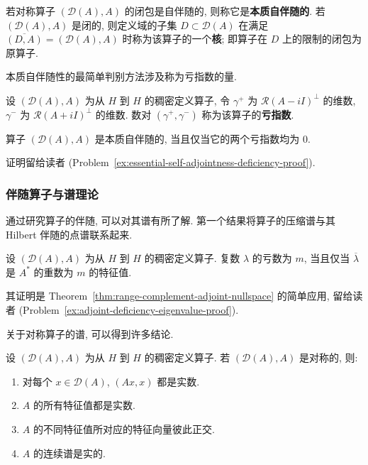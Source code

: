 \begin{Definition}
\label{def:essential-self-adjointness-and-core}
若对称算子 $(\mathcal{D}(A),A)$ 的闭包是自伴随的, 则称它是\textbf{本质自伴随的}. 若 $(\mathcal{D}(A),A)$ 是闭的, 则定义域的子集 $D\subset\mathcal{D}(A)$ 在满足 $\overline{(D,A)}=(\mathcal{D}(A),A)$ 时称为该算子的一个\textbf{核}; 即算子在 $D$ 上的限制的闭包为原算子.
\end{Definition}

本质自伴随性的最简单判别方法涉及称为亏指数的量.

\begin{Definition}
\label{def:operator-deficiency-indices}
设 $(\mathcal{D}(A),A)$ 为从 $H$ 到 $H$ 的稠密定义算子, 令 $\gamma^+$ 为 $\mathcal{R}(A-iI)^\perp$ 的维数, $\gamma^-$ 为 $\mathcal{R}(A+iI)^\perp$ 的维数. 数对 $(\gamma^+,\gamma^-)$ 称为该算子的\textbf{亏指数}.
\end{Definition}

\begin{Theorem}
\label{thm:essential-self-adjointness-zero-deficiency}
算子 $(\mathcal{D}(A),A)$ 是本质自伴随的, 当且仅当它的两个亏指数均为 $0$.
\end{Theorem}

证明留给读者 (Problem~\ref{ex:essential-self-adjointness-deficiency-proof}).

\subsubsection{伴随算子与谱理论}\label{subsec:adjoint-operators-spectral-theory}

通过研究算子的伴随, 可以对其谱有所了解. 第一个结果将算子的压缩谱与其 Hilbert 伴随的点谱联系起来.

\begin{Theorem}
\label{thm:adjoint-deficiency-conjugate-eigenvalue}
设 $(\mathcal{D}(A),A)$ 为从 $H$ 到 $H$ 的稠密定义算子. 复数 $\lambda$ 的亏数为 $m$, 当且仅当 $\overline\lambda$ 是 $A^*$ 的重数为 $m$ 的特征值.
\end{Theorem}

其证明是 Theorem~\ref{thm:range-complement-adjoint-nullspace} 的简单应用, 留给读者 (Problem~\ref{ex:adjoint-deficiency-eigenvalue-proof}).

关于对称算子的谱, 可以得到许多结论.

\begin{Theorem}
\label{thm:symmetric-operator-spectral-properties}
设 $(\mathcal{D}(A),A)$ 为从 $H$ 到 $H$ 的稠密定义算子. 若 $(\mathcal{D}(A),A)$ 是对称的, 则:\begin{enumerate}\item 对每个 $x\in\mathcal{D}(A)$, $(Ax,x)$ 都是实数.\item $A$ 的所有特征值都是实数.\item $A$ 的不同特征值所对应的特征向量彼此正交.\item $A$ 的连续谱是实的.\end{enumerate}
\end{Theorem}

